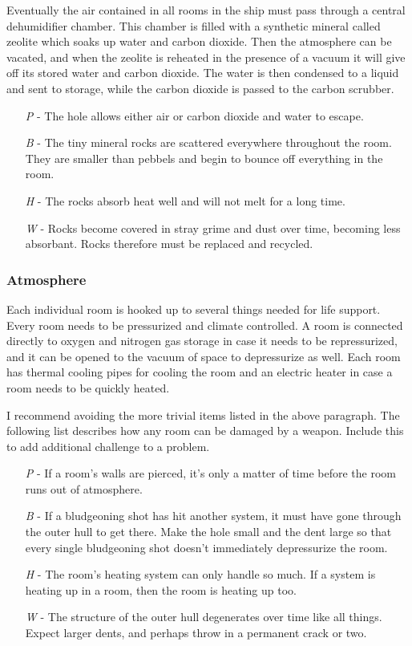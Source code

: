 \documentclass[a4paper]{article}
\begin{document}
Eventually the air contained in all rooms in the ship must pass through a central dehumidifier chamber. This chamber is filled with a synthetic mineral called zeolite which soaks up water and carbon dioxide. Then the atmosphere can be vacated, and when the zeolite is reheated in the presence of a vacuum it will give off its stored water and carbon dioxide. The water is then condensed to a liquid and sent to storage, while the carbon dioxide is passed to the carbon scrubber.
\begin{enumerate}
\item [\textit{P}] - The hole allows either air or carbon dioxide and water to escape.
\item [\textit{B}] - The tiny mineral rocks are scattered everywhere throughout the room. They are smaller than pebbels and begin to bounce off everything in the room.
\item [\textit{H}] - The rocks absorb heat well and will not melt for a long time.
\item [\textit{W}] - Rocks become covered in stray grime and dust over time, becoming less absorbant. Rocks therefore must be replaced and recycled.
\end{enumerate}

\vspace{-0.5cm} \hspace{-18pt} \subsubsection{Atmosphere} \label{life_atmosphere} \vspace{-0.2cm}
Each individual room is hooked up to several things needed for life support. Every room needs to be pressurized and climate controlled. A room is connected directly to oxygen and nitrogen gas storage in case it needs to be repressurized, and it can be opened to the vacuum of space to depressurize as well. Each room has thermal cooling pipes for cooling the room and an electric heater in case a room needs to be quickly heated.

I recommend avoiding the more trivial items listed in the above paragraph. The following list describes how any room can be damaged by a weapon. Include this to add additional challenge to a problem. 
\begin{enumerate}
\item [\textit{P}] - If a room's walls are pierced, it's only a matter of time before the room runs out of atmosphere.
\item [\textit{B}] - If a bludgeoning shot has hit another system, it must have gone through the outer hull to get there. Make the hole small and the dent large so that every single bludgeoning shot doesn't immediately depressurize the room.
\item [\textit{H}] - The room's heating system can only handle so much. If a system is heating up in a room, then the room is heating up too.
\item [\textit{W}] - The structure of the outer hull degenerates over time like all things. Expect larger dents, and perhaps throw in a permanent crack or two. 
\end{enumerate}
\end{document}
